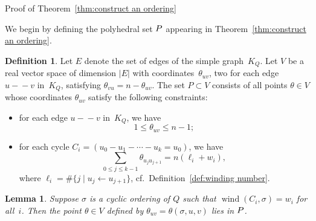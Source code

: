 \documentclass[11pt, letterpaper]{amsart}
\newtheorem{lemma}[theorem]{Lemma}
\theoremstyle{definition}
\newtheorem{definition}[theorem]{Definition}
\numberwithin{equation}{section}
\def\wind{{\operatorname{wind}}}
\newcommand\GQ{K_Q}
\begin{document}
\pagebreak[3]

\centerline{\sc Proof of Theorem~\ref{thm:construct an ordering}}

\medskip


We begin by defining the polyhedral set $P$ appearing in Theorem~\ref{thm:construct an ordering}.

\begin{definition}
\label{def:polyhedra for winding}
Let $E$ denote the set of edges of the simple graph~$\GQ$. 
Let $V$ be a real vector space of dimension $|E|$ with coordinates~$\theta_{uv}$,
two for each edge $u-\!\!-v$ in~$\GQ$, satisfying $\theta_{vu} = n-\theta_{uv}$.
The set $P\subset V$ consists of all points $\theta\in V$ whose coordinates $\theta_{uv}$ satisfy the following constraints: 
\begin{itemize}[leftmargin=.2in]
\item 
for each edge $u-\!\!-v$ in~$\GQ$, we have 
\begin{equation}
\label{eq:lp thetas}
1 \leq \theta_{uv} \leq n-1;
\end{equation}
\item
for each cycle $C_i = (u_0 - u_1 - \cdots - u_k = u_0)$, we have 
\begin{equation}
\label{eq:lp winding}
\sum_{0\le j\le k-1} \theta_{u_j u_{j+1}} = n( \ell_i + w_i),
\end{equation}
where $\ell_i=\#\{j\mid u_j \leftarrow u_{j+1}\}$, cf.\ Definition~\ref{def:winding number}. 
\end{itemize}
\end{definition}


\begin{lemma}
\label{lem:lp feasible}
Suppose $\sigma$ is a cyclic ordering of $Q$ such that $\wind(C_i, \sigma) = w_i$ for all~$i$.
Then the point $\theta\in V$ defined by $\theta_{uv} = \theta(\sigma, u, v)$ lies in $P$.
\end{lemma}
\end{document}
